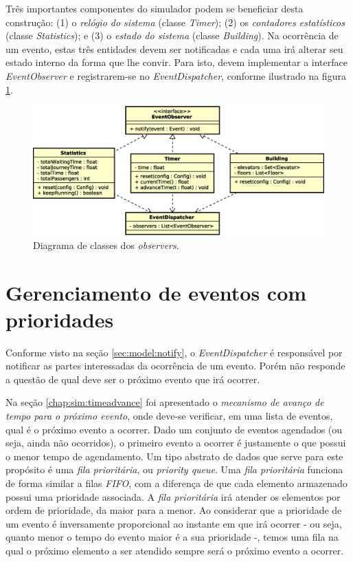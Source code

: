 Três importantes componentes do simulador podem se beneficiar desta construção:
(1) o \textit{relógio do sistema} (classe \textit{Timer}); (2) os
\textit{contadores estatísticos} (classe \textit{Statistics}); e (3) o
\textit{estado do sistema} (classe \textit{Building}). Na ocorrência de um
evento, estas três entidades devem ser notificadas e cada uma irá alterar seu
estado interno da forma que lhe convir. Para isto, devem implementar a interface
\textit{EventObserver} e registrarem-se no \textit{EventDispatcher}, conforme
ilustrado na figura \ref{fig:diagram:observers}.

\begin{figure}[htb!]
  \centering
  \includegraphics[scale=0.6]{img/Observers.eps}
  \caption{Diagrama de classes dos \textit{observers}.}
\label{fig:diagram:observers}
\end{figure}

\section{Gerenciamento de eventos com prioridades}

Conforme visto na seção \ref{sec:model:notify}, o \textit{EventDispatcher} é
responsável por notificar as partes interessadas da ocorrência de um evento.
Porém não responde a questão de qual deve ser o próximo evento que irá ocorrer.

Na seção \ref{chap:sim:timeadvance} foi apresentado o \textit{mecanismo de
avanço de tempo para o próximo evento}, onde deve-se verificar, em uma lista de
eventos, qual é o próximo evento a ocorrer. Dado um conjunto de eventos
agendados (ou seja, ainda não ocorridos), o primeiro evento a ocorrer é
justamente o que possui o menor tempo de agendamento. Um tipo abstrato de dados
que serve para este propósito é uma \textit{fila prioritária}, ou
\textit{priority queue}. Uma \textit{fila prioritária} funciona de forma similar
a filas \textit{FIFO}, com a diferença de que cada elemento armazenado possui
uma prioridade associada. A \textit{fila prioritária} irá atender os elementos
por ordem de prioridade, da maior para a menor. Ao considerar que a prioridade
de um evento é inversamente proporcional ao instante em que irá ocorrer - ou
seja, quanto menor o tempo do evento maior é a sua prioridade -, temos uma fila
na qual o próximo elemento a ser atendido sempre será o próximo evento a
ocorrer.

